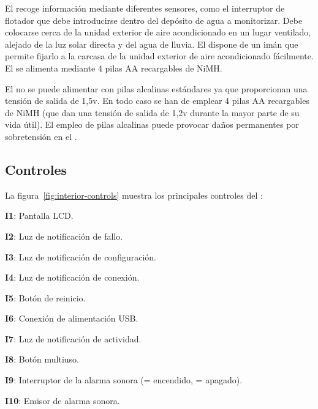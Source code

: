 El \MEE recoge información mediante diferentes sensores, como el interruptor de flotador que debe introducirse dentro del depósito de agua a monitorizar.
Debe colocarse cerca de la unidad exterior de aire acondicionado en un lugar ventilado, alejado de la luz solar directa y del agua de lluvia.
El \ME dispone de un imán que permite fijarlo a la carcasa de la unidad exterior de aire acondicionado fácilmente.
El \MEE se alimenta mediante 4 pilas AA recargables de NiMH.

El \MEE no se puede alimentar con pilas alcalinas estándares ya que proporcionan una tensión de salida de 1,5v. En todo caso se han de emplear 4 pilas AA recargables de NiMH (que dan una tensión de salida de 1,2v durante la mayor parte de su vida útil). El empleo de pilas alcalinas puede provocar daños permanentes por sobretensión en el \ME. 
\importantend

\endgroup

\subsection{Controles}
\label{sect:controles}

La figura~\ref{fig:interior-controls} muestra los principales controles del \MI:


\begin{enumeratecompact}
  \item[\textbf{\color{main}I1}:] Pantalla LCD.
  \item[\textbf{\color{main}I2}:] Luz de notificación de fallo.
  \item[\textbf{\color{main}I3}:] Luz de notificación de configuración.
  \item[\textbf{\color{main}I4}:] Luz de notificación de conexión.
  \item[\textbf{\color{main}I5}:] Botón de reinicio.
  \item[\textbf{\color{main}I6}:] Conexión de alimentación USB.
  \item[\textbf{\color{main}I7}:] Luz de notificación de actividad.
  \item[\textbf{\color{main}I8}:] Botón multiuso.
  \item[\textbf{\color{main}I9}:] Interruptor de la alarma sonora (\on = encendido, \off = apagado).
  \item[\textbf{\color{main}I10}:] Emisor de alarma sonora.
\end{enumeratecompact}

